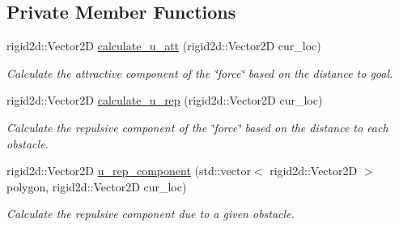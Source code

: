 \subsection*{Private Member Functions}
\begin{DoxyCompactItemize}
\item 
rigid2d\+::\+Vector2D \hyperlink{classpfield_1_1PtField_a1cbfedd08d4e271264f10e5b5c9b57bd}{calculate\+\_\+u\+\_\+att} (rigid2d\+::\+Vector2D cur\+\_\+loc)
\begin{DoxyCompactList}\small\item\em Calculate the attractive component of the \char`\"{}force\char`\"{} based on the distance to goal. \end{DoxyCompactList}\item 
rigid2d\+::\+Vector2D \hyperlink{classpfield_1_1PtField_a8d47de5b4a724e2100c70676e683298b}{calculate\+\_\+u\+\_\+rep} (rigid2d\+::\+Vector2D cur\+\_\+loc)
\begin{DoxyCompactList}\small\item\em Calculate the repulsive component of the \char`\"{}force\char`\"{} based on the distance to each obstacle. \end{DoxyCompactList}\item 
rigid2d\+::\+Vector2D \hyperlink{classpfield_1_1PtField_ac8e3ca79a5c7eb3baeaa4b6097df2c8f}{u\+\_\+rep\+\_\+component} (std\+::vector$<$ rigid2d\+::\+Vector2D $>$ polygon, rigid2d\+::\+Vector2D cur\+\_\+loc)
\begin{DoxyCompactList}\small\item\em Calculate the repulsive component due to a given obstacle. \end{DoxyCompactList}\end{DoxyCompactItemize}
